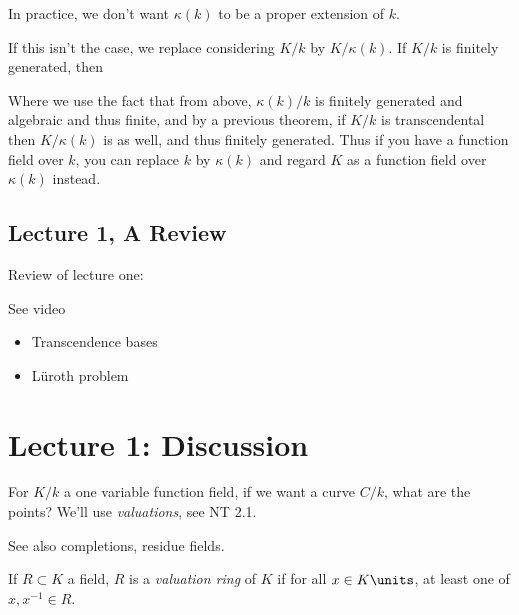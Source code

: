 In practice, we don't want \(\kappa(k)\) to be a proper extension of
\(k\).

If this isn't the case, we replace considering \(K/k\) by
\(K/\kappa(k)\). If \(K/k\) is finitely generated, then

\begin{center}
\end{center}

Where we use the fact that from above, \(\kappa(k)/k\) is finitely
generated and algebraic and thus finite, and by a previous theorem, if
\(K/k\) is transcendental then \(K/\kappa(k)\) is as well, and thus
finitely generated. Thus if you have a function field over \(k\), you
can replace \(k\) by \(\kappa(k)\) and regard \(K\) as a function field
over \(\kappa(k)\) instead.

\hypertarget{lecture-1-a-review}{%
\subsection{Lecture 1, A Review}\label{lecture-1-a-review}}

Review of lecture one:

\begin{theorem}

See video

\end{theorem}

\begin{itemize}
\tightlist
\item
  Transcendence bases
\item
  Lüroth problem
\end{itemize}

\hypertarget{lecture-1-discussion}{%
\section{Lecture 1: Discussion}\label{lecture-1-discussion}}

For \(K/k\) a one variable function field, if we want a curve \(C/k\),
what are the points? We'll use \emph{valuations}, see NT 2.1.

See also completions, residue fields.

If \(R \subset K\) a field, \(R\) is a \emph{valuation ring} of \(K\) if
for all \(x\in K\units\), at least one of \(x, x^{-1} \in R\).

